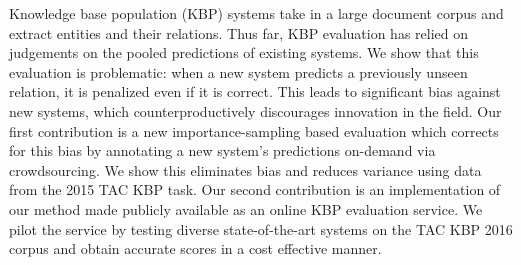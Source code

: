 Knowledge base population (KBP) systems take in a large document corpus and extract entities and their relations.
Thus far, KBP evaluation has relied on judgements on the pooled predictions of existing systems.
We show that this evaluation is problematic:
when a new system predicts a previously unseen relation, it is penalized even if it is correct.
This leads to significant bias against new systems, which counterproductively discourages innovation in the field.
Our first contribution is a new importance-sampling based evaluation which corrects for this bias by annotating a new system's predictions on-demand via crowdsourcing.
We show this eliminates bias and reduces variance using data from the 2015 TAC KBP task. %
Our second contribution is an implementation of our method made publicly available as an online KBP evaluation service.
We pilot the service by testing diverse state-of-the-art systems on the TAC KBP 2016 corpus and obtain accurate scores in a cost effective manner. 



